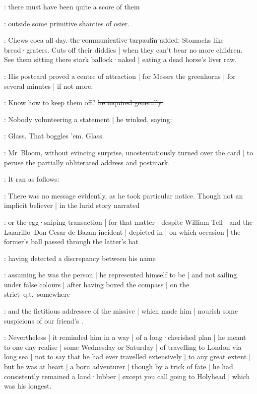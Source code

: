 :
there must have been quite a score of them

:
outside some primitive shanties of osier.

\Murphy:
Chews coca all day.
\sout{the communicative tarpaulin added.}
Stomachs like bread·graters.
Cuts off their diddies |
when they can't bear no more children.
See them sitting there stark ballock·naked |
eating a dead horse's liver raw.

:
His postcard proved a centre of attraction |
for Messrs the greenhorns |
for several minutes |
if not more.

\Murphy:
Know how to keep them off?
\sout{he inquired generally.}

:
Nobody volunteering a statement |
he winked,
saying:

\Murphy:
Glass.
That boggles 'em.
Glass.

:
Mr~Bloom,
without evincing surprise,
unostentatiously turned over the card |
to peruse the partially obliterated address and postmark.

:
It ran as follows:

:
There was no message evidently,
as he took particular notice.
Though not an implicit believer |
in the lurid story narrated

:
or the egg·sniping transaction |
for that matter |
despite William Tell |
and the Lazarillo--Don Cesar de Bazan incident |
depicted in  |
on which occasion |
the former's ball passed through the latter's hat

:
having detected a discrepancy between his name

:
assuming he was the person |
he represented himself to be |
and not sailing under false colours |
after having boxed the compass |
on the strict~q.t.\ somewhere

:
and the fictitious addressee of the missive |
which made him |
nourish some suspicions of our friend's .

:
Nevertheless |
it reminded him in a way |
of a long·cherished plan |
he meant to one day realise |
some Wednesday or Saturday |
of travelling to London via long sea |
not to say that he had ever travelled extensively |
to any great extent |
but he was at heart |
a born adventurer |
though by a trick of fate |
he had consistently remained a land·lubber |
except you call going to Holyhead |
which was his longest.

